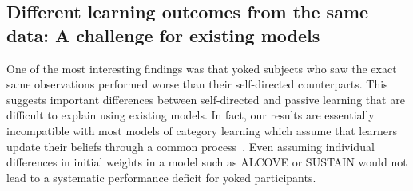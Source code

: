 \documentclass[3p,twocolumn,authoryear,10pt]{elsarticle}
\begin{document}







\subsection{Different learning outcomes from the same data: A challenge for existing models}

One of the most interesting findings was that yoked subjects who saw the exact same observations  performed worse than their self-directed counterparts.  This suggests important differences between self-directed and passive learning that are difficult to explain using existing models. In fact, our results are essentially incompatible with most models of category learning which assume that learners update their beliefs through a common process~\citep{Nosofsky:1984cl,Kruschke-1992um,Love-2004bp}.  Even assuming individual differences in initial weights in a model such as ALCOVE or SUSTAIN would not lead to a systematic performance
deficit for yoked participants.  

\end{document}
